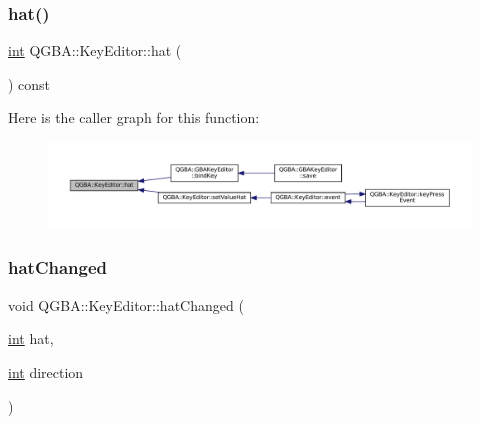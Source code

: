 \subsubsection{\texorpdfstring{hat()}{hat()}}
{\footnotesize\ttfamily \mbox{\hyperlink{ioapi_8h_a787fa3cf048117ba7123753c1e74fcd6}{int}} Q\+G\+B\+A\+::\+Key\+Editor\+::hat (\begin{DoxyParamCaption}{ }\end{DoxyParamCaption}) const\hspace{0.3cm}{\ttfamily [inline]}}

Here is the caller graph for this function\+:
\nopagebreak
\begin{figure}[H]
\begin{center}
\leavevmode
\includegraphics[width=350pt]{class_q_g_b_a_1_1_key_editor_a13aee5f3cf3a557a96334eda9b44b6d0_icgraph}
\end{center}
\end{figure}
\mbox{\label{class_q_g_b_a_1_1_key_editor_a1fe06073809c20b103d4a670343ecde1}} 
\subsubsection{\texorpdfstring{hat\+Changed}{hatChanged}}
{\footnotesize\ttfamily void Q\+G\+B\+A\+::\+Key\+Editor\+::hat\+Changed (\begin{DoxyParamCaption}\item[{\mbox{\hyperlink{ioapi_8h_a787fa3cf048117ba7123753c1e74fcd6}{int}}}]{hat,  }\item[{\mbox{\hyperlink{ioapi_8h_a787fa3cf048117ba7123753c1e74fcd6}{int}}}]{direction }\end{DoxyParamCaption})\hspace{0.3cm}{\ttfamily [signal]}}

